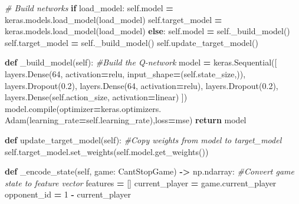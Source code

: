 \documentclass[12pt]{article}
\newenvironment{Shaded}{\begin{snugshade}}{\end{snugshade}}
\newcommand{\BuiltInTok}[1]{#1}
\newcommand{\CommentTok}[1]{\textcolor[rgb]{0.56,0.35,0.01}{\textit{#1}}}
\newcommand{\ControlFlowTok}[1]{\textcolor[rgb]{0.13,0.29,0.53}{\textbf{#1}}}
\newcommand{\DecValTok}[1]{\textcolor[rgb]{0.00,0.00,0.81}{#1}}
\newcommand{\FloatTok}[1]{\textcolor[rgb]{0.00,0.00,0.81}{#1}}
\newcommand{\KeywordTok}[1]{\textcolor[rgb]{0.13,0.29,0.53}{\textbf{#1}}}
\newcommand{\NormalTok}[1]{#1}
\newcommand{\OperatorTok}[1]{\textcolor[rgb]{0.81,0.36,0.00}{\textbf{#1}}}
\newcommand{\StringTok}[1]{\textcolor[rgb]{0.31,0.60,0.02}{#1}}
\newcommand{\VariableTok}[1]{\textcolor[rgb]{0.00,0.00,0.00}{#1}}
\begin{document}
\begin{thesis}
\begin{Shaded}
\begin{Highlighting}[]
        \CommentTok{\# Build networks}
        \ControlFlowTok{if}\NormalTok{ load\_model:}
            \VariableTok{self}\NormalTok{.model }\OperatorTok{=}\NormalTok{ keras.models.load\_model(load\_model)}
            \VariableTok{self}\NormalTok{.target\_model }\OperatorTok{=}\NormalTok{ keras.models.load\_model(load\_model)}
        \ControlFlowTok{else}\NormalTok{:}
            \VariableTok{self}\NormalTok{.model }\OperatorTok{=} \VariableTok{self}\NormalTok{.\_build\_model()}
            \VariableTok{self}\NormalTok{.target\_model }\OperatorTok{=} \VariableTok{self}\NormalTok{.\_build\_model()}
            \VariableTok{self}\NormalTok{.update\_target\_model()}
    
    \KeywordTok{def}\NormalTok{ \_build\_model(}\VariableTok{self}\NormalTok{):}
        \CommentTok{\#Build the Q{-}network}
\NormalTok{        model }\OperatorTok{=}\NormalTok{ keras.Sequential([}
\NormalTok{            layers.Dense(}\DecValTok{64}\NormalTok{, activation}\OperatorTok{=}\StringTok{\textquotesingle{}relu\textquotesingle{}}\NormalTok{, }
\NormalTok{            input\_shape}\OperatorTok{=}\NormalTok{(}\VariableTok{self}\NormalTok{.state\_size,)),}
\NormalTok{            layers.Dropout(}\FloatTok{0.2}\NormalTok{),}
\NormalTok{            layers.Dense(}\DecValTok{64}\NormalTok{, activation}\OperatorTok{=}\StringTok{\textquotesingle{}relu\textquotesingle{}}\NormalTok{),}
\NormalTok{            layers.Dropout(}\FloatTok{0.2}\NormalTok{),}
\NormalTok{            layers.Dense(}\VariableTok{self}\NormalTok{.action\_size, activation}\OperatorTok{=}\StringTok{\textquotesingle{}linear\textquotesingle{}}\NormalTok{)}
\NormalTok{        ])}
\NormalTok{        model.}\BuiltInTok{compile}\NormalTok{(optimizer}\OperatorTok{=}\NormalTok{keras.optimizers.}
\NormalTok{                      Adam(learning\_rate}\OperatorTok{=}\VariableTok{self}\NormalTok{.learning\_rate),loss}\OperatorTok{=}\StringTok{\textquotesingle{}mse\textquotesingle{}}\NormalTok{)}
        \ControlFlowTok{return}\NormalTok{ model}
    
    \KeywordTok{def}\NormalTok{ update\_target\_model(}\VariableTok{self}\NormalTok{):}
        \CommentTok{\#Copy weights from model to target\_model}
        \VariableTok{self}\NormalTok{.target\_model.set\_weights(}\VariableTok{self}\NormalTok{.model.get\_weights())}
    
    \KeywordTok{def}\NormalTok{ \_encode\_state(}\VariableTok{self}\NormalTok{, game: CantStopGame) }\OperatorTok{{-}\textgreater{}}\NormalTok{ np.ndarray:}
        \CommentTok{\#Convert game state to feature vector}
\NormalTok{        features }\OperatorTok{=}\NormalTok{ []}
\NormalTok{        current\_player }\OperatorTok{=}\NormalTok{ game.current\_player}
\NormalTok{        opponent\_id }\OperatorTok{=} \DecValTok{1} \OperatorTok{{-}}\NormalTok{ current\_player}
        

\end{Highlighting}
\end{Shaded}
\end{thesis}
\end{document}
